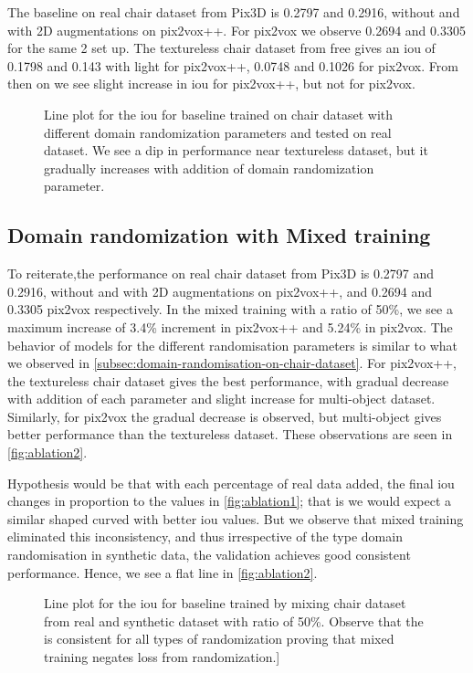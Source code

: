 The baseline on real chair dataset from Pix3D is 0.2797 and 0.2916, without and with 2D augmentations on pix2vox++.
For pix2vox we observe 0.2694 and 0.3305 for the same 2 set up.
The textureless chair dataset from \gls{free} gives an \gls{iou} of 0.1798 and 0.143 with light for pix2vox++, 0.0748 and 0.1026 for pix2vox.
From then on we see slight increase in \gls{iou} for pix2vox++, but not for pix2vox.

\begin{figure}
    \centering
    \resizebox{0.7\textwidth}{!}{}
    \caption{Line plot for the \gls{iou}  for baseline trained on chair dataset with different domain randomization parameters and tested on real dataset.
    We see a dip in performance near textureless dataset, but it gradually increases with addition of domain randomization parameter.}
    \label{fig:ablation1}
\end{figure}

\subsection{Domain randomization with Mixed training}\label{subsec:domain-randomisation-with-mixed-training}

To reiterate,the performance on real chair dataset from Pix3D is 0.2797 and 0.2916, without and with 2D augmentations on pix2vox++, and 0.2694 and 0.3305 pix2vox respectively.
In the mixed training with a ratio of 50\%, we see a maximum increase of 3.4\% increment in pix2vox++ and 5.24\% in pix2vox.
The behavior of models for the different randomisation parameters is similar to what we observed in \autoref{subsec:domain-randomisation-on-chair-dataset}.
For pix2vox++, the textureless chair dataset gives the best performance, with gradual decrease with addition of each parameter and slight increase for multi-object dataset.
Similarly, for pix2vox the gradual decrease is observed, but multi-object gives better performance than the textureless dataset.
These observations are seen in \autoref{fig:ablation2}.

Hypothesis would be that with each percentage of real data added, the final \gls{iou} changes in proportion to the values in \autoref{fig:ablation1}; that is we would expect a similar shaped curved with better \gls{iou} values.
But we observe that mixed training eliminated this inconsistency, and thus irrespective of the type domain randomisation in synthetic data, the validation achieves good consistent performance.
Hence, we see a flat line in \autoref{fig:ablation2}.
\begin{figure}
    \centering
    \resizebox{0.7\textwidth}{!}{}
    \caption{Line plot for the \gls{iou}  for baseline trained by mixing chair dataset from real and synthetic dataset with ratio of 50\%.
    Observe that the  is consistent for all types of randomization proving that mixed training negates loss from randomization.]}
    \label{fig:ablation2}
\end{figure}


